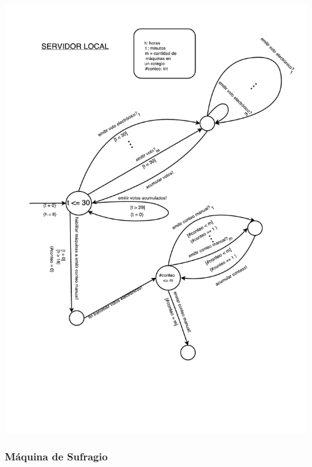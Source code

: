\documentclass[spanish, 10pt,a4paper]{article}
\numberwithin{equation}{section} %
\begin{document}
\vspace{\baselineskip}
    \begin{center}
                \includegraphics[scale=0.75, page=1]{imagenes/fsm/FSMServidorLocal.pdf}
                \\
                \vspace{1pt}
                \footnotesize\textit{}
        \end{center}
\vspace{\baselineskip}

\subsubsection{Máquina de Sufragio}
\end{document}
